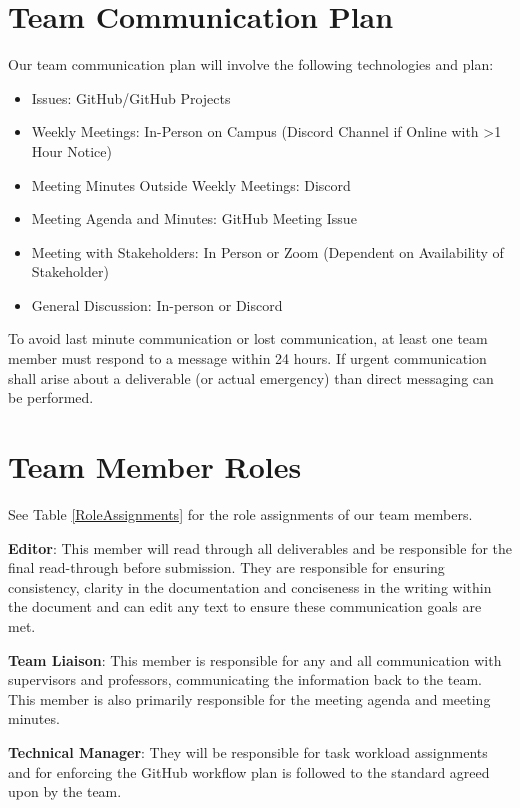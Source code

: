 \documentclass{article}
\begin{document}
\section{Team Communication Plan}

Our team communication plan will involve the following technologies and plan:
\begin{itemize}
  \item Issues: GitHub/GitHub Projects
  \item Weekly Meetings: In-Person on Campus (Discord Channel if Online with >1 Hour Notice)
  \item Meeting Minutes Outside Weekly Meetings: Discord
  \item Meeting Agenda and Minutes: GitHub Meeting Issue
  \item Meeting with Stakeholders: In Person or Zoom (Dependent on Availability of Stakeholder)
  \item General Discussion: In-person or Discord
\end{itemize}

To avoid last minute communication or lost communication, at least one team member must 
respond to a message within 24 hours. If urgent communication shall arise about a 
deliverable (or actual emergency) than direct messaging can be performed.

\section{Team Member Roles}

See Table \ref{RoleAssignments} for the role assignments of our team members.

\textbf{Editor}: This member will read through all deliverables and be responsible for 
the final read-through before submission. They are responsible for ensuring 
consistency, clarity in the documentation and conciseness in the writing within the 
document and can edit any text to ensure these communication goals are met.

\textbf{Team Liaison}: This member is responsible for any and all communication with 
supervisors and professors, communicating the information back to the team. This 
member is also primarily responsible for the meeting agenda and meeting minutes.

\textbf{Technical Manager}: They will be responsible for task 
workload assignments and for enforcing the GitHub workflow plan is followed to the 
standard agreed upon by the team.
\end{document}
